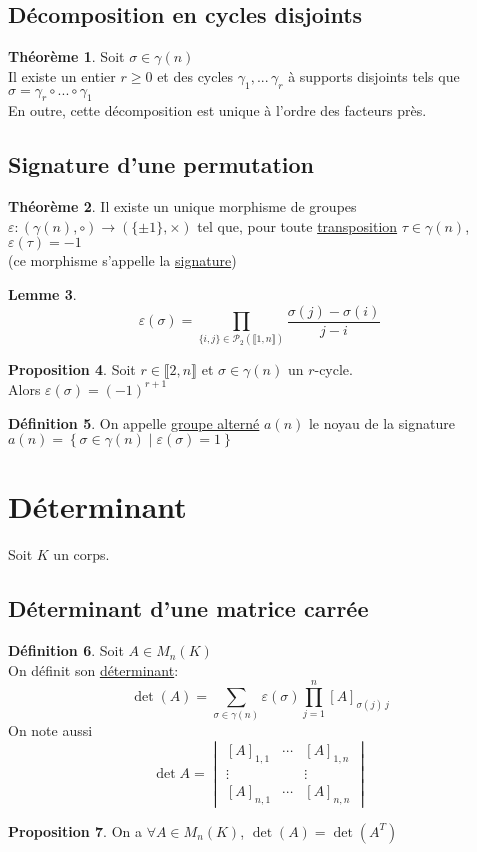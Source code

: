 \documentclass[10pt,a4paper]{article}
\theoremstyle{definition}
\newtheorem{proposition}{Proposition}[section]
\newtheorem{theorem}[proposition]{Théorème}
\newtheorem{lemme}[proposition]{Lemme}
\newtheorem{definition}[proposition]{Définition}
\begin{document}
\subsection{Décomposition en cycles disjoints}
\begin{theorem}
Soit $\sigma \in \gamma(n)$ \\
Il existe un entier $r \geq 0$ et des cycles $\gamma_1, ...\, \gamma_r$ à supports disjoints tels que $\sigma = \gamma_r \circ ... \circ \gamma_1$ \\
En outre, cette décomposition est unique à l'ordre des facteurs près.
\end{theorem}

\subsection{Signature d'une permutation}
\begin{theorem}
Il existe un unique morphisme de groupes $\varepsilon: (\gamma(n), \circ) \to (\{ \pm 1 \}, \times)$ tel que, pour toute \uline{transposition} $\tau \in \gamma(n)$, $\varepsilon(\tau) = -1$ \\
(ce morphisme s'appelle la \uline{signature})
\end{theorem}
\begin{lemme}
\[\varepsilon(\sigma) = \prod_{\{i, j\} \in \mathcal{P}_2(\llbracket 1, n \rrbracket)} \frac{\sigma(j) - \sigma(i)}{j - i}\]
\end{lemme}
\begin{proposition}
Soit $r \in \llbracket 2, n \rrbracket$ et $\sigma \in \gamma(n)$ un $r$-cycle. \\
Alors $\varepsilon(\sigma) = (-1)^{r + 1}$
\end{proposition}
\begin{definition}
On appelle \uline{groupe alterné} $a(n)$ le noyau de la signature $a(n) = \left\{ \sigma \in \gamma(n) \mid \varepsilon(\sigma) = 1 \right\}$
\end{definition}

\pagebreak

\section{Déterminant}
Soit $K$ un corps.
\subsection{Déterminant d'une matrice carrée}
\begin{definition}
Soit $A \in M_n(K)$ \\
On définit son \uline{déterminant}:
\[ \det(A) = \sum_{\sigma \in \gamma(n)} \varepsilon(\sigma) \prod_{j = 1}^n [A]_{\sigma(j) \, j}\]
On note aussi
\[ \det A = \begin{vmatrix}
[A]_{1, 1} & \cdots & [A]_{1, n} \\
\vdots & & \vdots \\
[A]_{n, 1} & \cdots & [A]_{n ,n}
\end{vmatrix}\]
\end{definition}
\begin{proposition}
On a $\forall A \in M_n(K)$, $\det(A) = \det(A^T)$
\end{proposition}
\end{document}
